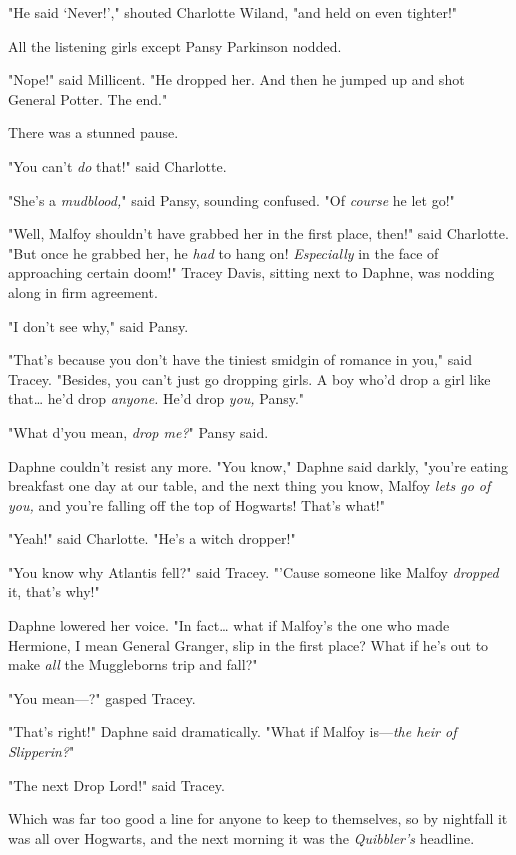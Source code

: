 "He said `Never!'," shouted Charlotte Wiland, "and held on even tighter!"

All the listening girls except Pansy Parkinson nodded.

"Nope!" said Millicent. "He dropped her. And then he jumped up and shot General
Potter. The end."

There was a stunned pause.

"You can't \emph{do} that!" said Charlotte.

"She's a \emph{mudblood,}" said Pansy, sounding confused. "Of \emph{course} he
let go!"

"Well, Malfoy shouldn't have grabbed her in the first place, then!" said
Charlotte. "But once he grabbed her, he \emph{had} to hang on!
\emph{Especially} in the face of approaching certain doom!" Tracey Davis,
sitting next to Daphne, was nodding along in firm agreement.

"I don't see why," said Pansy.

"That's because you don't have the tiniest smidgin of romance in you," said
Tracey. "Besides, you can't just go dropping girls. A boy who'd drop a girl
like that{\ldots} he'd drop \emph{anyone.} He'd drop \emph{you,} Pansy."

"What d'you mean, \emph{drop me?}" Pansy said.

Daphne couldn't resist any more. "You know," Daphne said darkly, "you're eating
breakfast one day at our table, and the next thing you know, Malfoy \emph{lets
go of you,} and you're falling off the top of Hogwarts! That's what!"

"Yeah!" said Charlotte. "He's a witch dropper!"

"You know why Atlantis fell?" said Tracey. "'Cause someone like Malfoy
\emph{dropped} it, that's why!"

Daphne lowered her voice. "In fact{\ldots} what if Malfoy's the one who made
Hermione, I mean General Granger, slip in the first place? What if he's out to
make \emph{all} the Muggleborns trip and fall?"

"You mean---?" gasped Tracey.

"That's right!" Daphne said dramatically. "What if Malfoy is---\emph{the heir
of Slipperin?}"

"The next Drop Lord!" said Tracey.

Which was far too good a line for anyone to keep to themselves, so by nightfall
it was all over Hogwarts, and the next morning it was the \emph{Quibbler's}
headline.

